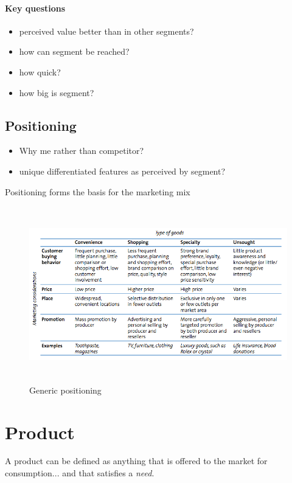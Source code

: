 \documentclass[a4paper,titlepage] {scrartcl}
\begin{document}


\paragraph{Key questions} %
\label{par:key_questions}
\begin{itemize}
	\item perceived value better than in other segments?
	\item how can segment be reached?
	\item how quick?
	\item how big is segment?
\end{itemize}

\subsection{Positioning}
\begin{itemize}
	\item Why me rather than competitor?
	\item unique differentiated features as perceived by segment?
\end{itemize}

Positioning forms the basis for the marketing mix
\begin{figure}[htbp]
	\centering
		\includegraphics[height=3in]{images/position.png}
	\caption{Generic positioning}
	\label{fig:images_position}
\end{figure}

\section{Product} %
\label{sub:product}
A product can be defined as anything that is offered to the market for consumption...
and that satisfies a \emph{need}.
\end{document}
